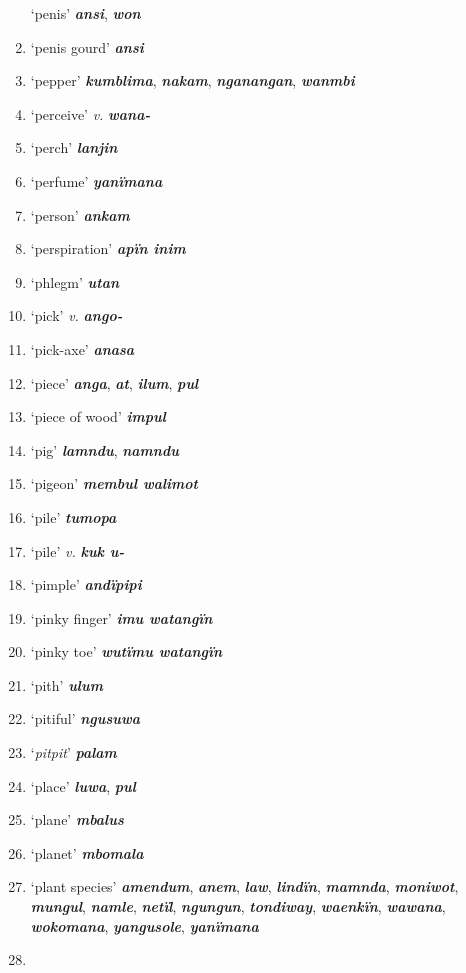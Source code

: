 \begin{enumerate}[noitemsep, label={}, align=left, widest=190, labelsep=1ex,leftmargin=*,itemindent=-10pt]
‘penis’ \textbf{\textit{ansi}}, \textbf{\textit{won}} \item
‘penis gourd’ \textbf{\textit{ansi}} \item
‘pepper’ \textbf{\textit{kumblima}}, \textbf{\textit{nakam}}, \textbf{\textit{nganangan}}, \textbf{\textit{wanmbi}} \item
‘perceive’ \textit{v.} \textbf{\textit{wana-}} \item
‘perch’ \textbf{\textit{lanjin}} \item
‘perfume’ \textbf{\textit{yanïmana}} \item
‘person’ \textbf{\textit{ankam}} \item
‘perspiration’ \textbf{\textit{apïn inim}} \item
‘phlegm’ \textbf{\textit{utan}} \item
‘pick’ \textit{v.} \textbf{\textit{ango-}} \item
‘pick-axe’ \textbf{\textit{anasa}} \item
‘piece’ \textbf{\textit{anga}}, \textbf{\textit{at}}, \textbf{\textit{ilum}}, \textbf{\textit{pul}} \item
‘piece of wood’ \textbf{\textit{impul}} \item
‘pig’ \textbf{\textit{lamndu}}, \textbf{\textit{namndu}} \item
‘pigeon’ \textbf{\textit{membul walimot}} \item
‘pile’ \textbf{\textit{tumopa}} \item
‘pile’ \textit{v.} \textbf{\textit{kuk u-}} \item
‘pimple’ \textbf{\textit{andïpipi}} \item
‘pinky finger’ \textbf{\textit{imu watangïn}} \item
‘pinky toe’ \textbf{\textit{wutïmu watangïn}} \item
‘pith’ \textbf{\textit{ulum}} \item
‘pitiful’ \textbf{\textit{ngusuwa}} \item
‘\textit{pitpit}’ \textbf{\textit{palam}} \item
‘place’ \textbf{\textit{luwa}}, \textbf{\textit{pul}} \item
‘plane’ \textbf{\textit{mbalus}} \item
‘planet’ \textbf{\textit{mbomala}} \item
‘plant species’ \textbf{\textit{amendum}}, \textbf{\textit{anem}}, \textbf{\textit{law}}, \textbf{\textit{lindïn}}, \textbf{\textit{mamnda}}, \textbf{\textit{moniwot}}, \textbf{\textit{mungul}}, \textbf{\textit{namle}}, \textbf{\textit{netïl}}, \textbf{\textit{ngungun}}, \textbf{\textit{tondiway}}, \textbf{\textit{waenkïn}}, \textbf{\textit{wawana}}, \textbf{\textit{wokomana}}, \linebreak \textbf{\textit{yangusole}}, \textbf{\textit{yanïmana}} \item

\end{enumerate}
